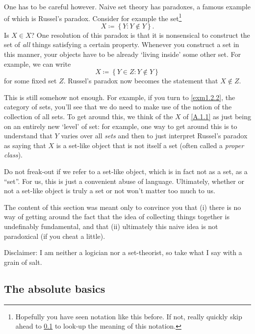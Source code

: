 One has to be careful however.  Naive set theory has paradoxes, a famous example of which is Russel's paradox.  Consider for example the set\footnote{Hopefully you have seen notation like this before.  If not, really quickly skip ahead to \cref{sbsA.1.2}  to look-up the meaning of this notation.}
\begin{equation}\label{A.1.1}
X\coloneqq \left\{ Y:Y\notin Y\right\} .
\end{equation}
Is $X\in X$?  One resolution of this paradox is that it is nonsensical to construct the set of \emph{all} things satisfying a certain property.  Whenever you construct a set in this manner, your objects have to be already `living inside' some other set.  For example, we can write
\begin{equation}
X\coloneqq \left\{ Y\in Z:Y\notin Y\right\}
\end{equation}
for some fixed set $Z$.  Russel's paradox now becomes the statement that $X\notin Z$.

This is still somehow not enough.  For example, if you turn to \cref{exm1.2.2}, the category of sets, you'll see that we do need to make use of the notion of the collection of all sets.  To get around this, we think of the $X$ of \eqref{A.1.1} as just being on an entirely new `level' of set:  for example, one way to get around this is to understand that $Y$ varies over all \emph{sets} and then to just interpret Russel's paradox as saying that $X$ is a set-like object that is not itself a set (often called a \emph{proper class}).

\begin{rmk}
Do not freak-out if we refer to a set-like object, which is in fact not as a set, as a ``set''.  For us, this is just a convenient abuse of language.  Ultimately, whether or not a set-like object is truly a set or not won't matter too much to us.
\end{rmk}

The content of this section was meant only to convince you that (i) there is no way of getting around the fact that the idea of collecting things together is undefinably fundamental, and that (ii) ultimately this naive idea is not paradoxical (if you cheat a little).

Disclaimer:  I am neither a logician nor a set-theorist, so take what I say with a grain of salt.

\subsection{The absolute basics}\label{sbsA.1.2}

